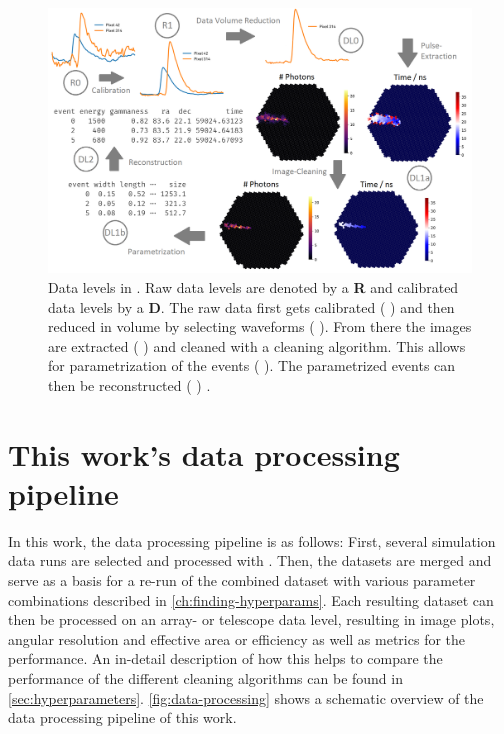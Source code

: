 \begin{figure}
    \centering
    \includegraphics[width=\textwidth]{graphics/ctapipe.png}
    \caption{Data levels in \ctapipe{}. Raw data levels are denoted by a \textbf{R} and calibrated
    data levels by a \textbf{D}. The raw data first gets calibrated (\rzero{} \rightarrow \rone{})
    and then reduced in volume by selecting waveforms (\rone{} \rightarrow \dlz{}). From there the
    images are extracted (\dlz{} \rightarrow \dloa{}) and cleaned with a cleaning algorithm. This
    allows for parametrization of the events (\dloa{} \rightarrow \dlob{}). The parametrized events
    can then be reconstructed (\dlob{} \rightarrow \dlt{}) \cite{noethe_thesis, hackfeld}. }
    \label{fig:ctapipe}
\end{figure}

\section{This work's data processing pipeline}
\label{sec:pipeline}

In this work, the data processing pipeline is as follows: First, several simulation data runs are
selected and processed with \ctapipe{}. Then, the datasets are merged and serve as a basis for a re-run
of the combined dataset with various parameter combinations described in \autoref{ch:finding-hyperparams}.
Each resulting dataset can then be processed on an array- or telescope data level, resulting in
\dloa{} image plots, angular resolution and effective area or efficiency as well as metrics for the
performance. An in-detail description of how this helps to compare the performance of the different
cleaning algorithms can be found in \autoref{sec:hyperparameters}. \autoref{fig:data-processing} shows
a schematic overview of the data processing pipeline of this work.


